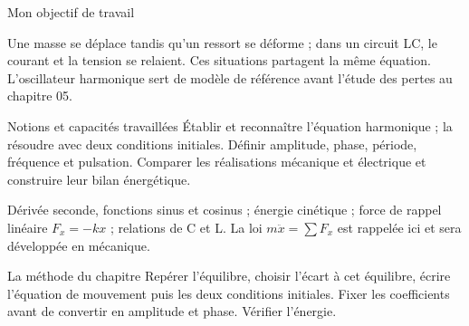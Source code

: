 \thispagestyle{mpsiFront}
\begin{docu}{Mon objectif de travail}\end{docu}

Une masse se déplace tandis qu’un ressort se déforme ; dans un circuit LC, le courant et la tension se relaient. Ces situations partagent la même équation. L’oscillateur harmonique sert de modèle de référence avant l’étude des pertes au chapitre 05.
\begin{loi}{Notions et capacités travaillées}
Établir et reconnaître l’équation harmonique ; la résoudre avec deux conditions initiales. Définir amplitude, phase, période, fréquence et pulsation. Comparer les réalisations mécanique et électrique et construire leur bilan énergétique.
\end{loi}

Dérivée seconde, fonctions sinus et cosinus ; énergie cinétique ; force de rappel linéaire $F_x=-kx$ ; relations de C et L. La loi $m\ddot x=\sum F_x$ est rappelée ici et sera développée en mécanique.

\begin{methode}{La méthode du chapitre}
Repérer l’équilibre, choisir l’écart à cet équilibre, écrire l’équation de mouvement puis les deux conditions initiales. Fixer les coefficients avant de convertir en amplitude et phase. Vérifier l’énergie.
\end{methode}


